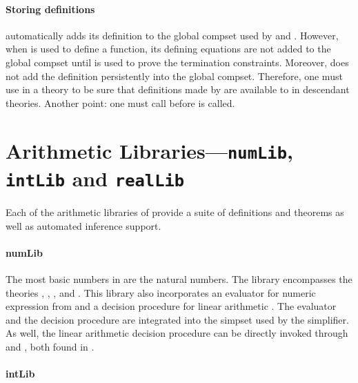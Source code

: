 \paragraph{Storing definitions}

 automatically adds its definition to the global compset
used by  and . However, when  is
used to define a function, its defining equations are not added to the
global compset until  is used to prove the termination
constraints.  Moreover,  does not add the definition
persistently into the global compset. Therefore, one must use
 in a theory to be sure that definitions
made by  are available to  in descendant
theories.  Another point: one must call 
before  is called.


\section{Arithmetic Libraries---\texttt{numLib}, \texttt{intLib} and \texttt{realLib}}
\label{sec:numLib}

Each of the arithmetic libraries of \HOL{} provide a
suite of definitions and theorems as well as automated inference support.

\paragraph{numLib}

The most basic numbers in \HOL{} are the natural numbers. The
 library encompasses the theories ,
, , and .
This library also incorporates an evaluator for numeric expression
from  and a decision procedure for linear arithmetic
. The evaluator and the decision procedure are
integrated into the simpset  used by the simplifier.
As well, the linear arithmetic decision procedure can be directly
invoked through  and , both found in
.


\paragraph{intLib}


